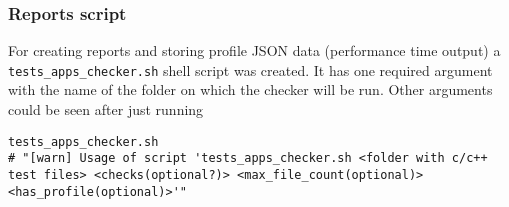 \subsubsection{Reports script}

For creating reports and storing profile JSON data (performance time output) a \lstinline{tests_apps_checker.sh} shell script was created. It has one required argument with the name of the folder on which the checker will be run. Other arguments could be seen after just running 

\begin{listing}[h]
\begin{verbatim}
tests_apps_checker.sh
# "[warn] Usage of script 'tests_apps_checker.sh <folder with c/c++ test files> <checks(optional?)> <max_file_count(optional)> <has_profile(optional)>'"
\end{verbatim}
\caption{Run \lstinline{tests_apps_checker.sh} in shell}
\end{listing}

